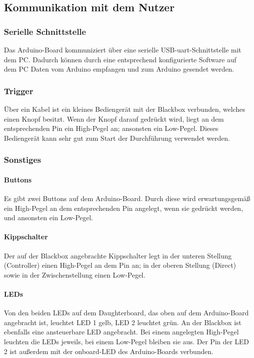 \documentclass{kis}
\begin{document}
\newpage
\subsection{Kommunikation mit dem Nutzer}

\subsubsection{Serielle Schnittstelle}
Das Arduino-Board kommuniziert über eine serielle USB-\gls{uart}-Schnittstelle mit dem PC. Dadurch können durch eine entsprechend konfigurierte Software auf dem PC Daten vom Arduino empfangen und zum Arduino gesendet werden.

\subsubsection{Trigger}
Über ein Kabel ist ein kleines Bediengerät mit der Blackbox verbunden, welches einen Knopf besitzt. Wenn der Knopf darauf gedrückt wird, liegt an dem entsprechenden Pin ein High-Pegel an; ansonsten ein Low-Pegel. Dieses Bediengerät kann sehr gut zum Start der Durchführung verwendet werden. 

\subsubsection{Sonstiges}
\paragraph{Buttons}
Es gibt zwei Buttons auf dem Arduino-Board. Durch diese wird erwartungsgemäß ein High-Pegel an dem entsprechenden Pin angelegt, wenn sie gedrückt werden, und ansonsten ein Low-Pegel.
\paragraph{Kippschalter}
Der auf der Blackbox angebrachte Kippschalter legt in der unteren Stellung (\glqq Controller\grqq) einen High-Pegel an dem Pin an; in der oberen Stellung (\glqq Direct\grqq) sowie in der Zwischenstellung einen Low-Pegel.
\paragraph{LEDs}
Von den beiden LEDs auf dem Daughterboard, das oben auf dem Arduino-Board angebracht ist, leuchtet LED 1 gelb, LED 2 leuchtet grün. An der Blackbox ist ebenfalls eine ansteuerbare LED angebracht. Bei einem angelegten High-Pegel leuchten die LEDs jeweils, bei einem Low-Pegel bleiben sie aus. Der Pin der LED 2 ist außerdem mit der onboard-LED des Arduino-Boards verbunden.
\end{document}
